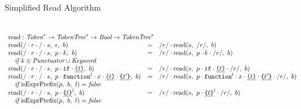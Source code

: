 \documentclass[preprint,10pt]{sigplanconf}
\begin{document}
\begin{displayfigure*}{\label{fig:simpleread}Simplified Read Algorithm}
\begin{minipage}[t]{0.5\linewidth}
\[\begin{array}{lcll}
  \end{array}
\]
\end{minipage}
\[
  \begin{array}{lcll}
    \multicolumn{3}{l}{\textrm{read} : \Tok^{*} \rightarrow \TT^{*}
      \rightarrow \textit{Bool} \rightarrow \TT^{*}}
    \\
    \readfn{/\cdot r \cdot /\cdot \vtok}{\epsilon}{b}
    &=&
    \cons{/r/}{
      \readfn{\vtok}{/r/}{b}
    }
    \\
    \readfn{/\cdot r \cdot /\cdot \vtok}{p \cdot k}{b}
    &=&
    \cons{/r/}{
      \readfn{\vtok}{
        p \cdot k \cdot /r/
      }{b}
    }
    \\
    \quad\textit{if}~k \in \textit{Punctuator} \cup \textit{Keyword}
    \\
    \readfn{/\cdot r \cdot /\cdot \vtok}{
      p \cdot \texttt{if} \cdot \parens{t}
    }{b}
    &=&
    \cons{/r/}{
      \readfn{\vtok}{p \cdot \texttt{if} \cdot \parens{t} \cdot /r/}{b}
    }
    \\
    \readfn{/\cdot r \cdot /\cdot \vtok}{
      p \cdot \texttt{function}^{l} \cdot x
      \cdot \parens{t} \cdot \curlies{t'}
    }{b}
    &=&
    \cons{/r/}{
      \readfn{\vtok}{
      p 
      \cdot \texttt{function}^{l} \cdot x \cdot 
      \parens{t} \cdot \curlies{t'}\cdot /r/
      }{b}
    } \\
    \quad \textit{if}~\isobject(p,~b,~l) = \false
    \\
    \readfn{/\cdot r \cdot / \cdot \vtok}{
      p \cdot \curlies{t}^{l}
    }{b}
    &=&
    \cons{/r/}{
      \readfn{\vtok}{
        p \cdot \curlies{t}^{l}\cdot /r/
      }{b}
    }
    \\
    \quad \textit{if}~ \isobject(p,~b,~l) = \false

    \\ \\


\end{array}\]
\end{displayfigure*}
\end{document}
